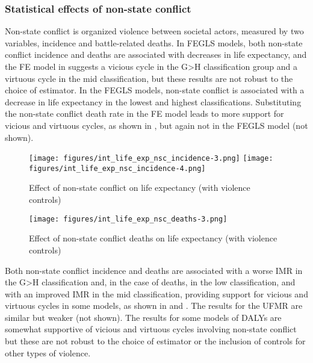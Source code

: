 \documentclass[12pt]{article}
\begin{document}
\clearpage

\clearpage

\subsubsection{Statistical effects of non-state conflict}

Non-state conflict is organized violence between societal actors, measured by two variables, incidence and battle-related deaths.
In FEGLS models, both non-state conflict incidence and deaths are associated with decreases in life expectancy, and the FE model in  suggests a vicious cycle in the G>H classification group and a virtuous cycle in the mid classification, but these results are not robust to the choice of estimator. In the FEGLS models, non-state conflict is associated with a decrease in life expectancy in the lowest and highest classifications.
Substituting the non-state conflict death rate in the FE model leads to more support for vicious and virtuous cycles, as shown in , but again not in the FEGLS model (not shown).

\begin{figure}[!htb]
    \centering
    \caption{Effect of non-state conflict on life expectancy (with violence controls)}
    \label{int_life_exp_nsc_incidence}
    \texttt{[image: figures/int\_life\_exp\_nsc\_incidence-3.png]}
    \texttt{[image: figures/int\_life\_exp\_nsc\_incidence-4.png]}
\end{figure}
\begin{figure}[!htb]
    \centering
    \caption{Effect of non-state conflict deaths on life expectancy (with violence controls)}
    \label{int_life_exp_nsc_deaths}
    \texttt{[image: figures/int\_life\_exp\_nsc\_deaths-3.png]}
\end{figure}

Both non-state conflict incidence and deaths are associated with a worse IMR in the G>H classification and, in the case of deaths, in the low classification, and with an improved IMR in the mid classification, providing support for vicious and virtuous cycles in some models, as shown in  and . The results for the UFMR are similar but weaker (not shown).
The results for some models of DALYs are somewhat supportive of vicious and virtuous cycles involving non-state conflict but these are not robust to the choice of estimator or the inclusion of controls for other types of violence.
\end{document}

